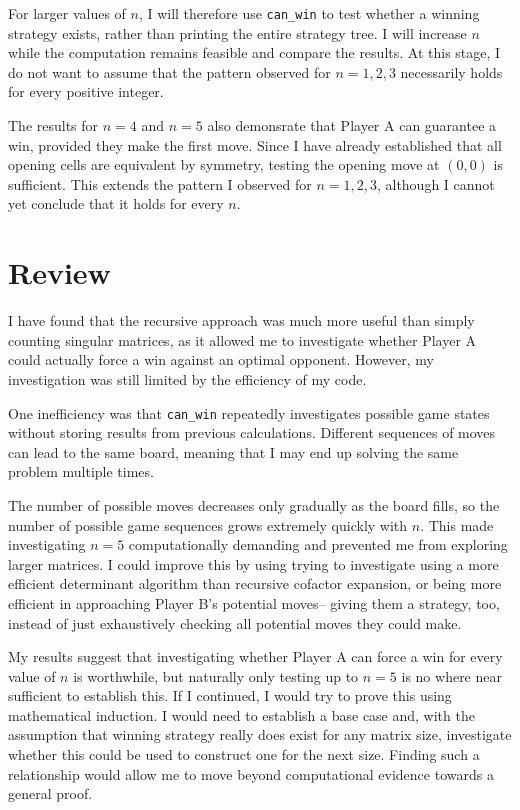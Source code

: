 \documentclass[11pt]{article}
\newcommand{\keywordfont}{\textsc}
\newcommand{\keyword}[1]{%
  \marginpar{\raggedright\small\keywordfont{#1}}}
\begin{document}
For larger values of $n$, I will therefore use \texttt{can\_win} to test whether a winning strategy exists, rather than printing the entire strategy tree. I will increase $n$ while the computation remains feasible and compare the results. At this stage, I do not want to assume that the pattern observed for $n=1,2,3$ necessarily holds for every positive integer.

The results for $n=4$ and $n=5$ also demonsrate that Player A can guarantee a win, provided they make the first move. Since I have already established that all opening cells are equivalent by symmetry, testing the opening move at $(0,0)$ is sufficient. This extends the pattern I observed for $n=1,2,3$, although I cannot yet conclude that it holds for every $n$.


\section*{Review}

I have found that the recursive approach was much more useful than simply counting singular matrices, as it allowed me to investigate whether Player A could actually force a win against an optimal opponent. However, my investigation was still limited by the efficiency of my code.

\keyword{Reflect} One inefficiency was that \texttt{can\_win} repeatedly investigates possible game states without storing results from previous calculations. Different sequences of moves can lead to the same board, meaning that I may end up solving the same problem multiple times.

The number of possible moves decreases only gradually as the board fills, so the number of possible game sequences grows extremely quickly with $n$. This made investigating $n=5$ computationally demanding and prevented me from exploring larger matrices. I could improve this by using trying to investigate using a more efficient determinant algorithm than recursive cofactor expansion, or being more efficient in approaching Player B's potential moves-- giving them a strategy, too, instead of just exhaustively checking all potential moves they could make.

\keyword{Conjecture} My results suggest that investigating whether Player A can force a win for every value of $n$ is worthwhile, but naturally only testing up to $n=5$ is no where near sufficient to establish this. If I continued, I would try to prove this using mathematical induction. I would need to establish a base case and, with the assumption that winning strategy really does exist for any matrix size, investigate whether this could be used to construct one for the next size. Finding such a relationship would allow me to move beyond computational evidence towards a general proof.
\end{document}
